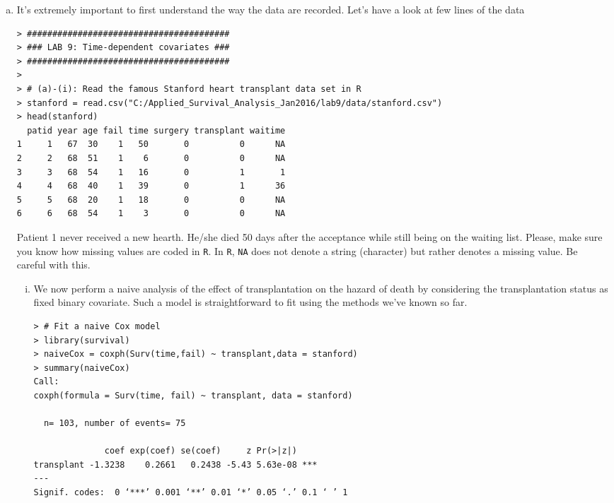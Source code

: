 \begin{enumerate}[(a)]
\item It's extremely important to first understand the way the data are recorded. Let's have a look at few lines of the data

\begin{spacing}{1.2}
\begin{footnotesize}
\begin{verbatim}
> ########################################
> ### LAB 9: Time-dependent covariates ###
> ########################################
> 
> # (a)-(i): Read the famous Stanford heart transplant data set in R
> stanford = read.csv("C:/Applied_Survival_Analysis_Jan2016/lab9/data/stanford.csv")
> head(stanford)
  patid year age fail time surgery transplant waitime
1     1   67  30    1   50       0          0      NA
2     2   68  51    1    6       0          0      NA
3     3   68  54    1   16       0          1       1
4     4   68  40    1   39       0          1      36
5     5   68  20    1   18       0          0      NA
6     6   68  54    1    3       0          0      NA
\end{verbatim}
\end{footnotesize}
\end{spacing}
Patient 1 never received a new hearth. He/she died 50 days after the acceptance while still being on the waiting list. 
Please, make sure you know how missing values are coded in \verb|R|. In \verb|R|, 
\verb|NA| does not denote a string (character) but rather denotes a missing value. Be careful with this. 
\begin{enumerate}[(i)]
\item We now perform a naive analysis of the effect of transplantation on the hazard of death by considering the transplantation status as fixed binary covariate. Such a model is straightforward to fit using the methods we've known so far. 
\begin{spacing}{1.2}
\begin{footnotesize}
\begin{verbatim}
> # Fit a naive Cox model
> library(survival)
> naiveCox = coxph(Surv(time,fail) ~ transplant,data = stanford)
> summary(naiveCox)
Call:
coxph(formula = Surv(time, fail) ~ transplant, data = stanford)

  n= 103, number of events= 75 

              coef exp(coef) se(coef)     z Pr(>|z|)    
transplant -1.3238    0.2661   0.2438 -5.43 5.63e-08 ***
---
Signif. codes:  0 ‘***’ 0.001 ‘**’ 0.01 ‘*’ 0.05 ‘.’ 0.1 ‘ ’ 1


\end{verbatim}
\end{footnotesize}
\end{spacing}
\end{enumerate}
\end{enumerate}

